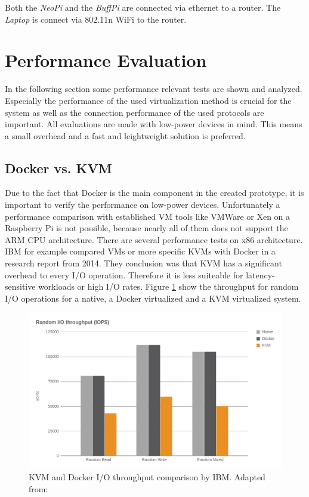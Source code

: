 Both the \textit{NeoPi} and the \textit{BuffPi} are connected via ethernet to a router.
The \textit{Laptop} is connect via 802.11n WiFi to the router.

\section{Performance Evaluation}
\label{section:performance-evaluation}
In the following section some performance relevant tests are shown and analyzed.
Especially the performance of the used virtualization method is crucial for the system as well as the connection performance of the used protocols are important.
All evaluations are made with low-power devices in mind.
This means a small overhead and a fast and leightweight solution is preferred.

\subsection{Docker vs. KVM}
Due to the fact that Docker is the main component in the created prototype, it is important to verify the performance on low-power devices.
Unfortunately a performance comparison with established \ac{VM} tools like VMWare or Xen on a Raspberry Pi is not possible, because nearly all of them does not support the ARM \ac{CPU} architecture.
There are several performance tests on x86 architecture.
IBM for example compared \acp{VM} or more specific \acp{KVM} with Docker in a research report\autocite{IBM:Performance:2014} from 2014.
They conclusion was that \ac{KVM} has a significant overhead to every I/O operation.
Therefore it is less suiteable for latency-sensitive workloads or high I/O rates.
Figure \ref{fig:ibm_kvm_docker_io} show the throughput for random I/O operations for a native, a Docker virtualized and a \ac{KVM} virtualized system.

\begin{figure}[H]
    \centering
    \includegraphics[width=\textwidth]{resources/images/performance_ibm_kvm_docker_io.png}
    \caption[KVM and Docker I/O throughput comparison by IBM]{KVM and Docker I/O throughput comparison by IBM. Adapted from: \autocite[p. 6]{IBM:Performance:2014}}
    \label{fig:ibm_kvm_docker_io}
\end{figure}

